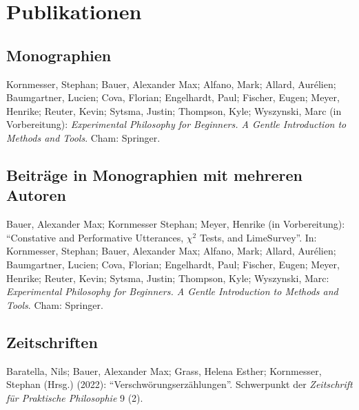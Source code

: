 \documentclass[a4paper,10pt]{article}
\newenvironment{literature}{%
   \parskip6pt\parindent0pt\raggedright
   \def\lititem{\hangindent=1cm\hangafter1}}{%
   \par\ignorespaces}
\begin{document}
\clearpage
\section{Publikationen}
\subsection*{Monographien}
\begin{literature}
\lititem Kornmesser, Stephan; Bauer, Alexander Max; Alfano, Mark; Allard, Aurélien; Baumgartner, Lucien; Cova, Florian; Engelhardt, Paul; Fischer, Eugen; Meyer, Henrike; Reuter, Kevin; Sytsma, Justin; Thompson, Kyle; Wyszynski, Marc (in Vorbereitung): \textit{Experimental Philosophy for Beginners. A Gentle Introduction to Methods and Tools}. Cham: Springer.
\end{literature}

\subsection*{Beiträge in Monographien mit mehreren Autoren}
\begin{literature}
\lititem Bauer, Alexander Max; Kornmesser Stephan; Meyer, Henrike (in Vorbereitung): \enquote{Constative and Performative Utterances, $\chi^2$ Tests, and LimeSurvey}. In: Kornmesser, Stephan; Bauer, Alexander Max; Alfano, Mark; Allard, Aurélien; Baumgartner, Lucien; Cova, Florian; Engelhardt, Paul; Fischer, Eugen; Meyer, Henrike; Reuter, Kevin; Sytsma, Justin; Thompson, Kyle; Wyszynski, Marc: \textit{Experimental Philosophy for Beginners. A Gentle Introduction to Methods and Tools}. Cham: Springer.
\end{literature}

\subsection*{Zeitschriften}
\begin{literature}
\lititem Baratella, Nils; Bauer, Alexander Max; Grass, Helena Esther; Kornmesser, Stephan (Hrsg.) (2022): \enquote{Verschwörungserzählungen}. Schwerpunkt der \textit{Zeitschrift für Praktische Philosophie} 9 (2).
\end{literature}
\end{document}
